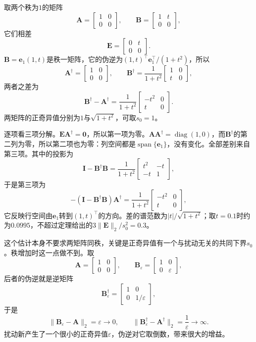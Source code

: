 \begin{example}[秩不变时的伪逆变化]
\label{ex:ls-pseudoinverse-fixed-rank}
取两个秩为$1$的矩阵
\[
 \bm A=\begin{bmatrix}1&0\\0&0\end{bmatrix},\qquad
 \bm B=\begin{bmatrix}1&t\\0&0\end{bmatrix},
\]
它们相差
\[
 \bm E=\begin{bmatrix}0&t\\0&0\end{bmatrix}.
\]
$\bm B=\bm e_1(1,t)$是秩一矩阵，它的伪逆为$(1,t)^\top\bm e_1^\top/(1+t^2)$，所以
\[
 \bm A^\dagger=\begin{bmatrix}1&0\\0&0\end{bmatrix},\qquad
 \bm B^\dagger=\frac1{1+t^2}\begin{bmatrix}1&0\\t&0\end{bmatrix},
\]
两者之差为
\[
 \bm B^\dagger-\bm A^\dagger=\frac1{1+t^2}\begin{bmatrix}-t^2&0\\t&0\end{bmatrix}.
\]
两矩阵的正奇异值分别为$1$与$\sqrt{1+t^2}$，可取$s_0=1$。

逐项看三项分解。$\bm E\bm A^\dagger=\bm0$，所以第一项为零。$\bm A\bm A^\dagger=\operatorname{diag}(1,0)$，而$\bm B^\dagger$的第二列为零，所以第二项也为零：列空间都是$\operatorname{span}\{\bm e_1\}$，没有变化。全部差别来自第三项。其中的投影为
\[
 \bm I-\bm B^\dagger\bm B=\frac1{1+t^2}\begin{bmatrix}t^2&-t\\-t&1\end{bmatrix},
\]
于是第三项为
\[
 -(\bm I-\bm B^\dagger\bm B)\bm A^\dagger=\frac1{1+t^2}\begin{bmatrix}-t^2&0\\t&0\end{bmatrix},
\]
它反映行空间由$\bm e_1$转到$(1,t)^\top$的方向。差的谱范数为$|t|/\sqrt{1+t^2}$；取$t=0.1$时约为$0.0995$，不超过定理给出的$3\lVert\bm E\rVert_2/s_0^2=0.3$。
\end{example}

这个估计本身不要求两矩阵同秩，关键是正奇异值有一个与扰动无关的共同下界$s_0$。秩增加时这一点做不到。取
\[
 \bm A=\begin{bmatrix}1&0\\0&0\end{bmatrix},\qquad
 \bm B_\varepsilon=\begin{bmatrix}1&0\\0&\varepsilon\end{bmatrix},
\]
后者的伪逆就是逆矩阵
\[
 \bm B_\varepsilon^\dagger=\begin{bmatrix}1&0\\0&1/\varepsilon\end{bmatrix},
\]
于是
\[
 \lVert\bm B_\varepsilon-\bm A\rVert_2=\varepsilon\to0,\qquad
 \lVert\bm B_\varepsilon^\dagger-\bm A^\dagger\rVert_2=\frac1\varepsilon\to\infty .
\]
扰动新产生了一个很小的正奇异值$\varepsilon$，伪逆对它取倒数，带来很大的增益。

